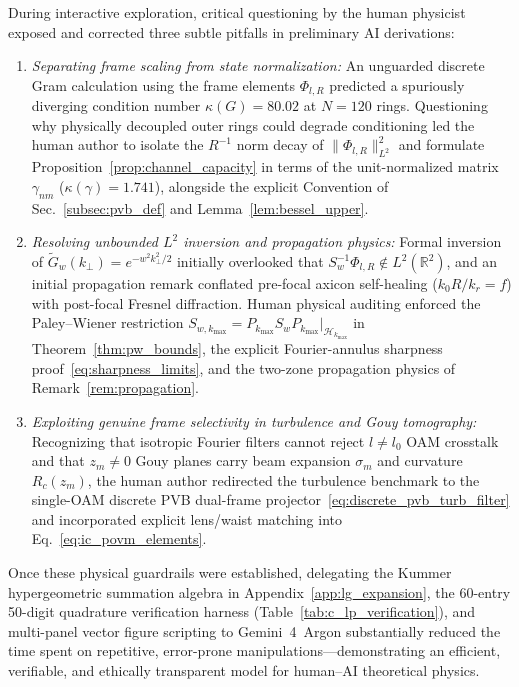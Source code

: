 \documentclass[aps,pra,reprint,amsmath,amssymb,floatfix,longbibliography]{revtex4-2}
\providecommand{\norm}[1]{\lVert#1\rVert}
\begin{document}
During interactive exploration, critical questioning by the human physicist exposed and corrected three subtle pitfalls in preliminary AI derivations:
\begin{enumerate}
\item \emph{Separating frame scaling from state normalization:} An unguarded discrete Gram calculation using the frame elements $\Phi_{l,R}$ predicted a spuriously diverging condition number $\kappa(G) = 80.02$ at $N = 120$ rings. Questioning why physically decoupled outer rings could degrade conditioning led the human author to isolate the $R^{-1}$ norm decay of $\norm{\Phi_{l,R}}_{L^2}^2$ and formulate Proposition~\ref{prop:channel_capacity} in terms of the unit-normalized matrix $\gamma_{nm}$ ($\kappa(\gamma) = 1.741$), alongside the explicit Convention of Sec.~\ref{subsec:pvb_def} and Lemma~\ref{lem:bessel_upper}.
\item \emph{Resolving unbounded $L^2$ inversion and propagation physics:} Formal inversion of $\widetilde{G}_w(k_\perp) = e^{-w^2 k_\perp^2/2}$ initially overlooked that $S_w^{-1}\Phi_{l,R} \notin L^2(\mathbb{R}^2)$, and an initial propagation remark conflated pre-focal axicon self-healing ($k_0 R/k_r = f$) with post-focal Fresnel diffraction. Human physical auditing enforced the Paley--Wiener restriction $S_{w,k_{\max}} = P_{k_{\max}}S_w P_{k_{\max}}\big|_{\mathcal{H}_{k_{\max}}}$ in Theorem~\ref{thm:pw_bounds}, the explicit Fourier-annulus sharpness proof~\eqref{eq:sharpness_limits}, and the two-zone propagation physics of Remark~\ref{rem:propagation}.
\item \emph{Exploiting genuine frame selectivity in turbulence and Gouy tomography:} Recognizing that isotropic Fourier filters cannot reject $l \neq l_0$ OAM crosstalk and that $z_m \neq 0$ Gouy planes carry beam expansion $\sigma_m$ and curvature $R_c(z_m)$, the human author redirected the turbulence benchmark to the single-OAM discrete PVB dual-frame projector~\eqref{eq:discrete_pvb_turb_filter} and incorporated explicit lens/waist matching into Eq.~\eqref{eq:ic_povm_elements}.
\end{enumerate}
Once these physical guardrails were established, delegating the Kummer hypergeometric summation algebra in Appendix~\ref{app:lg_expansion}, the 60-entry 50-digit quadrature verification harness (Table~\ref{tab:c_lp_verification}), and multi-panel vector figure scripting to Gemini~4~Argon substantially reduced the time spent on repetitive, error-prone manipulations—demonstrating an efficient, verifiable, and ethically transparent model for human--AI theoretical physics.
\end{document}
